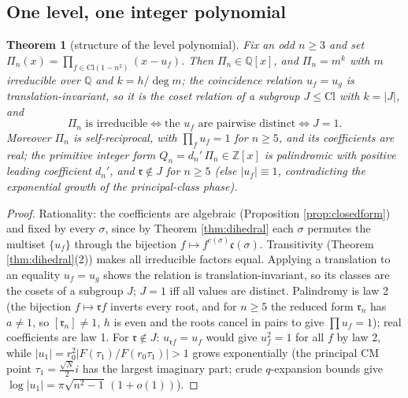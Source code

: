 \documentclass[11pt]{amsart}
\numberwithin{equation}{section}
\theoremstyle{plain}
\newtheorem{theorem}{Theorem}[section]
\theoremstyle{definition}
\theoremstyle{remark}
\newcommand{\Q}{\mathbb{Q}}
\newcommand{\Z}{\mathbb{Z}}
\newcommand{\Cl}{\mathrm{Cl}}
\newcommand{\idealc}{\mathfrak{c}}
\newcommand{\idealr}{\mathfrak{r}}
\begin{document}
\subsection{One level, one integer polynomial}\label{subsec:levelpoly}

\begin{theorem}[structure of the level polynomial]\label{thm:levelpoly}
Fix an odd $n \ge 3$ and set
$\Pi_n(x) = \prod_{f \in \Cl(1 - n^2)}(x - u_f)$.  Then $\Pi_n \in
\Q[x]$, and $\Pi_n = m^k$ with $m$ irreducible over $\Q$ and
$k = h/\deg m$; the coincidence relation $u_f = u_g$ is
translation-invariant, so it is the coset relation of a subgroup
$J \le \Cl$ with $k = |J|$, and
\[
  \Pi_n \text{ is irreducible} \iff \text{the } u_f \text{ are
  pairwise distinct} \iff J = 1 .
\]
Moreover $\Pi_n$ is self-reciprocal, with $\prod_f u_f = 1$ for
$n \ge 5$, and its coefficients are real; the
primitive integer form $Q_n = d_n'\,\Pi_n \in \Z[x]$ is palindromic
with positive leading coefficient $d_n'$, and $\idealr \notin J$ for
$n \ge 5$ (else $|u_f| \equiv 1$, contradicting the exponential growth
of the principal-class phase).
\end{theorem}

\begin{proof}
Rationality: the coefficients are algebraic (Proposition
\ref{prop:closedform}) and fixed by every $\sigma$, since by Theorem
\ref{thm:dihedral} each $\sigma$ permutes the multiset $\{u_f\}$
through the bijection $f \mapsto f^{e(\sigma)}\idealc(\sigma)$.
Transitivity (Theorem \ref{thm:dihedral}(2)) makes all irreducible
factors equal.  Applying a translation to an equality $u_f = u_g$
shows the relation is translation-invariant, so its classes are the
cosets of a subgroup $J$; $J = 1$ iff all values are distinct.
Palindromy is law 2 (the bijection $f \mapsto \idealr f$ inverts every
root, and for $n \ge 5$ the reduced form $\idealr_n$ has $a \ne 1$, so
$[\idealr_n] \ne 1$, $h$ is even and the roots cancel in pairs to give
$\prod u_f = 1$); real coefficients are law 1.  For $\idealr \notin
J$: $u_{\idealr f} = u_f$ would give $u_f^2 = 1$ for all $f$ by law 2,
while $|u_1| = r_0^2|F(\tau_1)/F(r_0\tau_1)| > 1$ grows exponentially
(the principal CM point $\tau_1 = \tfrac{\sqrt N}{2}i$ has the largest
imaginary part; crude $q$-expansion bounds give $\log|u_1| =
\pi\sqrt{n^2 - 1}\,(1 + o(1))$).
\end{proof}
\end{document}

